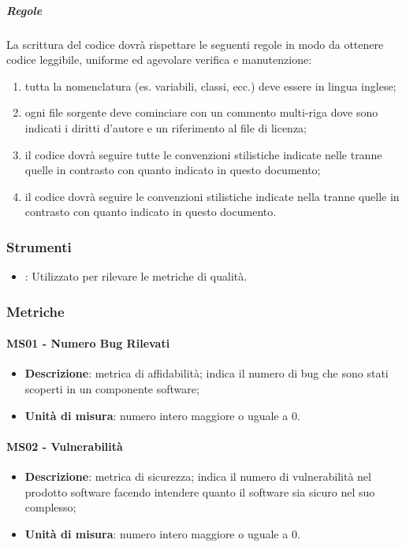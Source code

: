             \subparagraph{Regole}
   			La scrittura del codice dovrà rispettare le seguenti regole in modo da ottenere codice leggibile, uniforme ed agevolare verifica e manutenzione:
   			\begin{enumerate}
                \item tutta la nomenclatura (es. variabili, classi, ecc.) deve essere in lingua inglese;
                \item ogni file sorgente deve cominciare con un commento multi-riga dove sono indicati i diritti d'autore e un riferimento al file di licenza;
                \item il codice  dovrà seguire tutte le convenzioni stilistiche indicate nelle  tranne quelle in contrasto con quanto indicato in questo documento;
                \item il codice  dovrà seguire le convenzioni stilistiche indicate nella  tranne quelle in contrasto con quanto indicato in questo documento.
            \end{enumerate}

    \subsubsection{Strumenti}
    \begin{itemize}
        \item \textbf{}: Utilizzato per rilevare le metriche di qualità.
    \end{itemize}


	\subsubsection{Metriche}
		\paragraph{MS01 - Numero Bug Rilevati}
		\begin{itemize}
			\item \textbf{Descrizione}: metrica di affidabilità; indica il numero di bug che sono stati scoperti in un componente software;
			\item \textbf{Unità di misura}: numero intero maggiore o uguale a 0.
		\end{itemize}

        \paragraph{MS02 - Vulnerabilità}
        \begin{itemize}
            \item \textbf{Descrizione}: metrica di sicurezza; indica il numero di vulnerabilità nel prodotto software facendo intendere quanto il software sia sicuro nel suo complesso;
            \item \textbf{Unità di misura}: numero intero maggiore o uguale a 0.
        \end{itemize}

